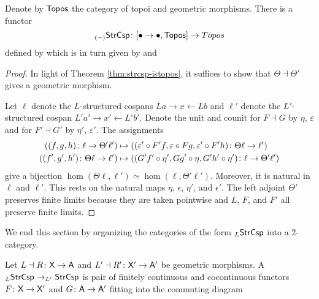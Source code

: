 \documentclass[oneside]{amsart}
\begin{document}
\begin{theorem} \label{thm:strcsp-isfunctorial}
  Denote by $ \mathsf{Topos} $ the category of topoi and
  geometric morphisms. There is a functor
  \[
    _{(-)}\mathsf{StrCsp}
      \colon [\bullet \to \bullet, \mathsf{Topos} ]
      \to   Topos
  \]
  defined by  which is
  in turn given by  and
  
\end{theorem}
\begin{proof}
  In light of Theorem \ref{thm:strcsp-istopos}, it suffices
  to show that $ \Theta \dashv \Theta' $ gives a geometric
  morphism.

  Let $ \ell $ denote the $ L $-structured cospans
  $ La \to x \gets Lb$ and $\ell'$ denote the
  $ L' $-structured cospan $ L'a' \to x' \gets L'b'$. Denote
  the unit and counit for $F \dashv G$ by $ \eta $,
  $ \varepsilon $ and for $ F' \dashv G' $ by $ \eta' $,
  $ \varepsilon' $.  The assignments
  \begin{align*}
    \left( (f,g,h)\colon\ell\to\Theta'\ell' \right)
      & \mapsto
        \left( (\varepsilon'\circ F'f,
        \varepsilon\circ Fg,
        \varepsilon'\circ F'h )
        \colon\Theta\ell\to\ell'\right) \\
    \left( (f',g',h')\colon\Theta\ell\to\ell'\right)
      & \mapsto
        \left( (G'f'\circ\eta',Gg'\circ\eta,G'h'\circ\eta')
        \colon\ell\to\Theta'\ell'\right) 
  \end{align*}  
  give a bijection
  $ \hom (\Theta\ell,\ell') \simeq \hom (\ell,\Theta'\ell'
  )$. Moreover, it is natural in $\ell$ and $\ell'$. This
  rests on the natural maps $\eta$, $\epsilon$, $\eta'$, and
  $\epsilon'$. The left adjoint $\Theta'$ preserves finite
  limits because they are taken pointwise and $ L $, $ F $,
  and $ F' $ all preserve finite limits.
\end{proof}

We end this section by organizing the categories of the form
$ _L\mathsf{StrCsp} $ into a 2-category. 

\begin{definition} \label{df:str_csp_category}
  Let $ L \dashv R \colon \mathsf{X} \to \mathsf{A} $ and
  $ L' \dashv R' \colon \mathsf{X}' \to \mathsf{A}' $ be geometric
  morphisms. A 
  $ _L\mathsf{StrCsp} \to _{L'}\mathsf{StrCsp} $ is pair of finitely
  continuous and cocontinuous functors
  $ F \colon \mathsf{X} \to \mathsf{X}' $ and $ G \colon \mathsf{A} \to \mathsf{A}' $ fitting
  into the commuting diagram
  
\end{definition}
\end{document}
